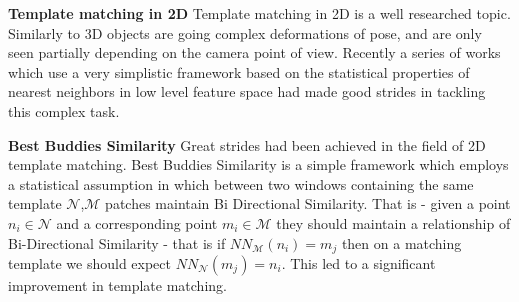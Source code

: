 \documentclass[10pt,twocolumn,letterpaper]{article}
\begin{document}
\textbf{Template matching in 2D}
Template matching in 2D is a well researched topic. Similarly to 3D objects are going complex deformations of pose, and are only seen partially depending on the camera point of view. Recently a series of works which use a very simplistic framework based on the statistical properties of nearest neighbors in low level feature space had made good strides in tackling this complex task.

\textbf{Best Buddies Similarity}
Great strides had been achieved in the field of 2D template matching. Best Buddies Similarity\cite{dekel2015best} is a simple framework which employs a statistical assumption in which between two windows containing the same template $\mathcal{N}$,$\mathcal{M}$ patches maintain Bi Directional Similarity. 
That is - given a point $n_i\in\mathcal{N}$ and a corresponding point $m_i\in\mathcal{M}$ they should maintain a relationship of Bi-Directional Similarity - that is if $NN_{\mathcal{M}}(n_i)=m_j$ then on a matching template we should expect $NN_{\mathcal{N}}(m_j)=n_i$. This led to a significant improvement in template matching.
\end{document}
